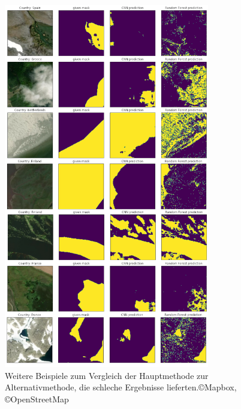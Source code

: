 \begin{figure}
    \centering
    \includegraphics[width=0.8\textwidth]{images/bsp_bad.png}
    \caption{Weitere Beispiele zum Vergleich der Hauptmethode zur Alternativmethode, die schleche Ergebnisse lieferten.\copyright Mapbox, \copyright OpenStreetMap}
    \label{fig:bsp_bad}
\end{figure}
